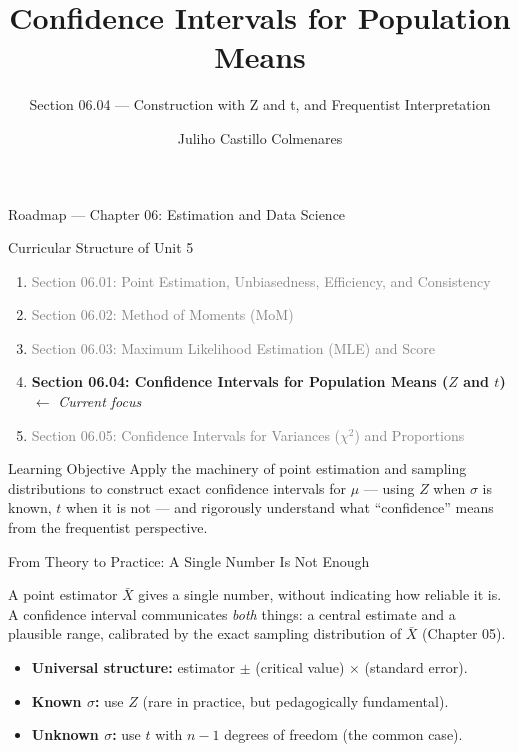 \documentclass[aspectratio=169,xcolor={dvipsnames,table}]{beamer}
\title{Confidence Intervals for Population Means}
\subtitle{Section 06.04 --- Construction with Z and t, and Frequentist Interpretation}
\author[J. Castillo Colmenares]{Juliho Castillo Colmenares}
\institute[Tec de Monterrey]{Tecnologico de Monterrey}
\date{\vspace{-1.5cm}}
\begin{document}
\begin{frame}[plain]
	\titlepage
\end{frame}

\begin{frame}{Roadmap --- Chapter 06: Estimation and Data Science}
	\vspace{-0.15cm}
	\begin{block}{Curricular Structure of Unit 5}
		\footnotesize
		\begin{enumerate}\itemsep=0.03cm
			\item \textcolor{gray}{Section 06.01: Point Estimation, Unbiasedness, Efficiency, and Consistency}
			\item \textcolor{gray}{Section 06.02: Method of Moments (MoM)}
			\item \textcolor{gray}{Section 06.03: Maximum Likelihood Estimation (MLE) and Score}
			\item \textbf{\textcolor{TecRojo}{Section 06.04: Confidence Intervals for Population Means ($Z$ and $t$)}} $\leftarrow$ \emph{Current focus}
			\item \textcolor{gray}{Section 06.05: Confidence Intervals for Variances ($\chi^2$) and Proportions}
		\end{enumerate}
	\end{block}
	\vspace{-0.2cm}
	\begin{alertblock}{Learning Objective}
		\scriptsize
		Apply the machinery of point estimation and sampling distributions to construct exact confidence intervals for $\mu$ --- using $Z$ when $\sigma$ is known, $t$ when it is not --- and rigorously understand what ``confidence'' means from the frequentist perspective.
	\end{alertblock}
\end{frame}

\begin{frame}{From Theory to Practice: A Single Number Is Not Enough}
	\footnotesize
	\begin{motivacion}
		A point estimator $\bar X$ gives a single number, without indicating how reliable it is. A confidence interval communicates \emph{both} things: a central estimate and a plausible range, calibrated by the exact sampling distribution of $\bar X$ (Chapter 05).
	\end{motivacion}
	\vspace{0.15cm}
	\pause
	\begin{itemize}\itemsep=0.1cm
		\item \textbf{Universal structure:} estimator $\pm$ (critical value) $\times$ (standard error). \pause
		\item \textbf{Known $\sigma$:} use $Z$ (rare in practice, but pedagogically fundamental). \pause
		\item \textbf{Unknown $\sigma$:} use $t$ with $n-1$ degrees of freedom (the common case).
	\end{itemize}
\end{frame}
\end{document}
